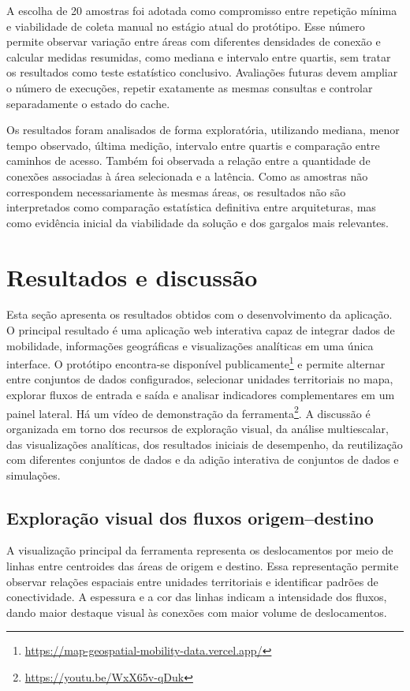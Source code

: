 \documentclass[12pt]{article}
\begin{document}
A escolha de 20 amostras foi adotada como compromisso entre repetição mínima e viabilidade de coleta manual no estágio atual do protótipo. Esse número permite observar variação entre áreas com diferentes densidades de conexão e calcular medidas resumidas, como mediana e intervalo entre quartis, sem tratar os resultados como teste estatístico conclusivo. Avaliações futuras devem ampliar o número de execuções, repetir exatamente as mesmas consultas e controlar separadamente o estado do cache.

Os resultados foram analisados de forma exploratória, utilizando mediana, menor tempo observado, última medição, intervalo entre quartis e comparação entre caminhos de acesso. Também foi observada a relação entre a quantidade de conexões associadas à área selecionada e a latência. Como as amostras não correspondem necessariamente às mesmas áreas, os resultados não são interpretados como comparação estatística definitiva entre arquiteturas, mas como evidência inicial da viabilidade da solução e dos gargalos mais relevantes.

\section{Resultados e discussão}

Esta seção apresenta os resultados obtidos com o desenvolvimento da aplicação. O principal resultado é uma aplicação web interativa capaz de integrar dados de mobilidade, informações geográficas e visualizações analíticas em uma única interface. O protótipo encontra-se disponível publicamente\footnote{\url{https://map-geospatial-mobility-data.vercel.app/}} e permite alternar entre conjuntos de dados configurados, selecionar unidades territoriais no mapa, explorar fluxos de entrada e saída e analisar indicadores complementares em um painel lateral. Há um vídeo de demonstração da ferramenta\footnote{\url{https://youtu.be/WxX65v-qDuk}}. A discussão é organizada em torno dos recursos de exploração visual, da análise multiescalar, das visualizações analíticas, dos resultados iniciais de desempenho, da reutilização com diferentes conjuntos de dados e da adição interativa de conjuntos de dados e simulações.

\subsection{Exploração visual dos fluxos origem--destino}

A visualização principal da ferramenta representa os deslocamentos por meio de linhas entre centroides das áreas de origem e destino. Essa representação permite observar relações espaciais entre unidades territoriais e identificar padrões de conectividade. A espessura e a cor das linhas indicam a intensidade dos fluxos, dando maior destaque visual às conexões com maior volume de deslocamentos.
\end{document}
